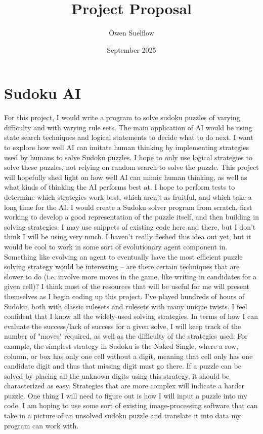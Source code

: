 \documentclass{article}
\title{Project Proposal}
\author{Owen Suelflow}
\date{September 2025}
\begin{document}
\maketitle

\section{Sudoku AI}
For this project, I would write a program to solve sudoku puzzles of varying difficulty and with varying rule sets.
The main application of AI would be using state search techniques and logical statements to decide what to do next.
I want to explore how well AI can imitate human thinking by implementing strategies used by humans to solve Sudoku puzzles.
I hope to only use logical strategies to solve these puzzles, not relying on random search to solve the puzzle.
This project will hopefully shed light on how well AI can mimic human thinking, as well as what kinds of thinking the AI performs best at.
I hope to perform tests to determine which strategies work best, which aren't as fruitful, and which take a long time for the AI.
I would create a Sudoku solver program from scratch, first working to develop a good representation of the puzzle itself, and then building in solving strategies.
I may use snippets of existing code here and there, but I don't think I will be using very much. 
I haven't really fleshed this idea out yet, but it would be cool to work in some sort of evolutionary agent component in.
Something like evolving an agent to eventually have the most efficient puzzle solving strategy would be interesting -- are there certain techniques that are slower to do (i.e. involve more moves in the game, like writing in candidates for a given cell)?
I think most of the resources that will be useful for me will present themselves as I begin coding up this project. I've played hundreds of hours of Sudoku, both with classic rulesets and rulesets with many unique twists. I feel confident that I know all the widely-used solving strategies.
In terms of how I can evaluate the success/lack of success for a given solve, I will keep track of the number of "moves" required, as well as the difficulty of the strategies used.
For example, the simplest strategy in Sudoku is the Naked Single, where a row, column, or box has only one cell without a digit, meaning that cell only has one candidate digit and thus that missing digit must go there. 
If a puzzle can be solved by placing all the unknown digits using this strategy, it should be characterized as easy. Strategies that are more complex will indicate a harder puzzle. One thing I will need to figure out is how I will input a puzzle into my code. I am hoping to use some sort of existing image-processing software that can take in a picture of an unsolved sudoku puzzle and translate it into data my program can work with.
\end{document}
